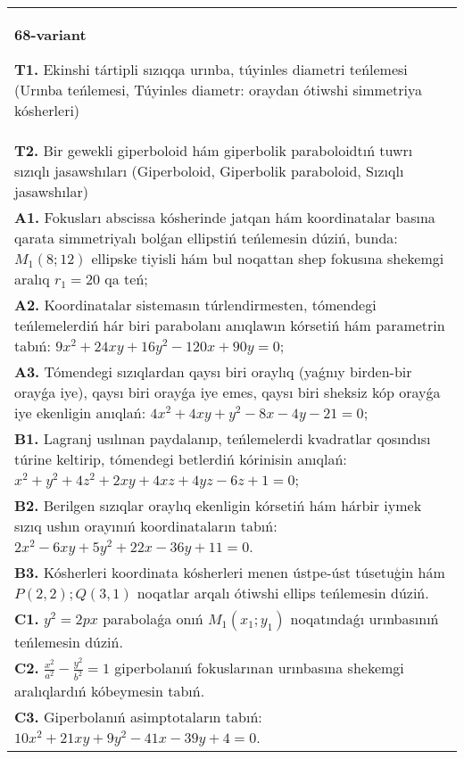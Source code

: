 \documentclass{article}
\begin{document}
\begin{tabular}{m{17cm}}
\textbf{68-variant}
\newline

\textbf{T1.} Ekinshi tártipli sızıqqa urınba, túyinles diametri teńlemesi (Urınba teńlemesi, Túyinles diametr: oraydan ótiwshi simmetriya kósherleri) \\
\textbf{T2.} Bir gewekli giperboloid hám giperbolik paraboloidtıń tuwrı sızıqlı jasawshıları (Giperboloid, Giperbolik paraboloid, Sızıqlı jasawshılar) \\
\textbf{A1.} Fokusları abscissa kósherinde jatqan hám koordinatalar basına qarata simmetriyalı bolǵan ellipstiń teńlemesin dúziń, bunda: $M_1 (8; 12) $ ellipske tiyisli hám bul noqattan shep fokusına shekemgi aralıq $r_1=20$ qa teń; \\
\textbf{A2.} Koordinatalar sistemasın túrlendirmesten, tómendegi teńlemelerdiń hár biri parabolanı anıqlawın kórsetiń hám parametrin tabıń: $9 x^2+24 x y+16 y^2-120 x+90 y=0$; \\
\textbf{A3.} Tómendegi sızıqlardan qaysı biri oraylıq (yaǵnıy birden-bir orayǵa iye), qaysı biri orayǵa iye emes, qaysı biri sheksiz kóp orayǵa iye ekenligin anıqlań:  $4 x^2+4 x y+y^2-8 x-4 y-21=0$; \\
\textbf{B1.} Lagranj usılınan paydalanıp, teńlemelerdi kvadratlar qosındısı túrine keltirip, tómendegi betlerdiń kórinisin anıqlań: $x^2+y^2+4 z^2+2 x y+4 x z+4 y z-6 z+1=0$; \\
\textbf{B2.} Berilgen sızıqlar oraylıq ekenligin kórsetiń hám hárbir iymek sızıq ushın orayınıń koordinataların tabıń: $2 x^2-6 x y+5 y^2+22 x-36 y+11=0$. \\
\textbf{B3.} Kósherleri koordinata kósherleri menen ústpe-úst túsetuģin hám $P (2,2); Q (3,1) $ noqatlar arqalı ótiwshi ellips teńlemesin dúziń. \\
\textbf{C1.} $y^2=2 p x$ parabolaǵa onıń $M_1\left(x_1; y_1\right) $ noqatındaǵı urınbasınıń teńlemesin dúziń. \\
\textbf{C2.} $\frac{x^2}{a^2}-\frac{y^2}{b^2}=1$ giperbolanıń fokuslarınan urınbasına shekemgi aralıqlardıń kóbeymesin tabıń. \\
\textbf{C3.} Giperbolanıń asimptotaların tabıń: $10 x^2+21 x y+9 y^2-41 x-39 y+4=0$. \\

\end{tabular}
\vspace{1cm}
\end{document}
